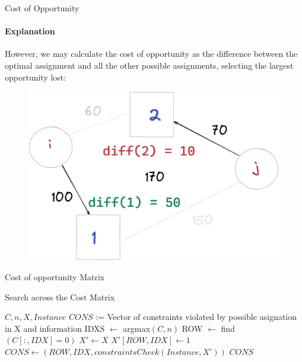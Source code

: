 \documentclass{beamer}
\begin{document}
\begin{frame}{Cost of Opportunity}
    \framesubtitle{Explanation}
    However, we may calculate the cost of opportunity as the difference between the optimal assignment and all the other possible assignments, selecting the largest opportunity lost:
    \begin{figure}
        \centering
        \includegraphics[scale=0.25]{Screenshot_3}
    \end{figure}
\end{frame}

\begin{frame}{Cost of opportunity Matrix}
\end{frame}

\begin{frame}{Search across the Cost Matrix}
        \begin{algorithmic}[1]
            \REQUIRE $C, n, X, Instance$
            \ENSURE $CONS$ := Vector of constraints violated by possible asignation in X and information
            \STATE IDXS $\gets$ argmax$(C, n)$
                    \STATE ROW $\gets$ find$(C[:, IDX] = 0)$
                    \STATE $X' \gets X$
                    \STATE $X'[ROW, IDX] \gets 1$
                    \STATE $CONS \gets \left( ROW, IDX, constraintsCheck(Instance, X') \right)$
                \ENDIF
            \ENDFOR
            \RETURN $CONS$
        \end{algorithmic}
\end{frame}
\end{document}
